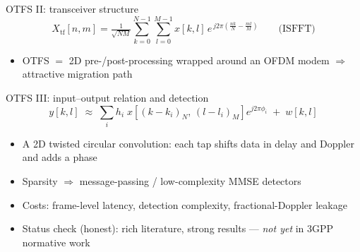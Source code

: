 \begin{frame}{OTFS II: transceiver structure}
  \begin{equation*}
    X_{\mathrm{tf}}[n,m]=\tfrac{1}{\sqrt{NM}}
    \sum_{k=0}^{N-1}\sum_{l=0}^{M-1}x[k,l]\,
    e^{\,j2\pi\left(\frac{nk}{N}-\frac{ml}{M}\right)}\qquad\text{(ISFFT)}
  \end{equation*}
  \centering
  \resizebox{0.98\textwidth}{!}{}
  \begin{itemize}\itemsep1pt
    \item OTFS $=$ 2D pre-/post-processing wrapped around an OFDM modem
          $\Rightarrow$ attractive migration path
  \end{itemize}
\end{frame}

\begin{frame}{OTFS III: input--output relation and detection}
  \begin{equation*}
    y[k,l]\;\approx\;\sum_{i}h_i\;
    x\!\left[(k-k_i)_N,\,(l-l_i)_M\right]e^{j2\pi\phi_i}\;+\;w[k,l]
  \end{equation*}
  \begin{itemize}\itemsep2pt
    \item A \alert{2D twisted circular convolution}: each tap shifts data in
          delay and Doppler and adds a phase
    \item Sparsity $\Rightarrow$ message-passing / low-complexity MMSE
          detectors
    \item Costs: frame-level latency, detection complexity, fractional-Doppler
          leakage
    \item Status check (honest): rich literature, strong results ---
          \emph{not yet} in 3GPP normative work
  \end{itemize}
\end{frame}


